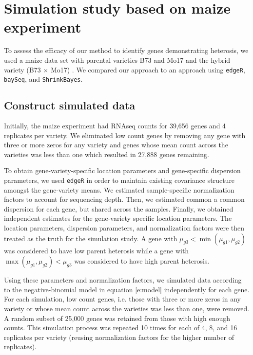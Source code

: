 \documentclass[useAMS,usenatbib,referee]{biom}
\begin{document}
\section{Simulation study based on maize experiment}
\label{s:simulation}

% 

To assess the efficacy of our method to identify genes demonstrating heterosis, we used a maize data set with parental varieties B73 and Mo17 and the hybrid variety (B73 $\times$ Mo17) \citep{paschold2012complementation}. We compared our approach to an approach using {\tt edgeR}, {\tt baySeq}, and {\tt ShrinkBayes}.

\subsection{Construct simulated data}

Initially, the maize experiment had RNAseq counts for 39,656 genes and 4 replicates per variety. We eliminated low count genes by removing any gene with three or more zeros for any variety and genes whose mean count across the varieties was less than one which resulted in 27,888 genes remaining.

To obtain gene-variety-specific location parameters and gene-specific dispersion parameters, we used {\tt edgeR} in order to maintain existing covariance structure amongst the gene-variety means. We estimated sample-specific normalization factors to account for sequencing depth. Then, we estimated common a common dispersion for each gene, but shared across the samples. Finally, we obtained independent estimates for the gene-variety specific location parameters. The location parameters, dispersion parameters, and normalization factors were then treated as the truth for the simulation study. A gene with $\mu_{g3} < \min(\mu_{g1}, \mu_{g2})$ was considered to have low parent heterosis while a gene with $\max(\mu_{g1},\mu_{g2}) < \mu_{g3}$ was considered to have high parent heterosis.

Using these parameters and normalization factors, we simulated data according to the negative-binomial model in equation \eqref{e:model} independently for each gene. For each simulation, low count genes, i.e. those with three or more zeros in any variety or whose mean count across the varieties was less than one, were removed. A random subset of 25,000 genes was retained from those with high enough counts. This simulation process was repeated 10 times for each of 4, 8, and 16 replicates per variety (reusing normalization factors for the higher number of replicates). 
\end{document}
